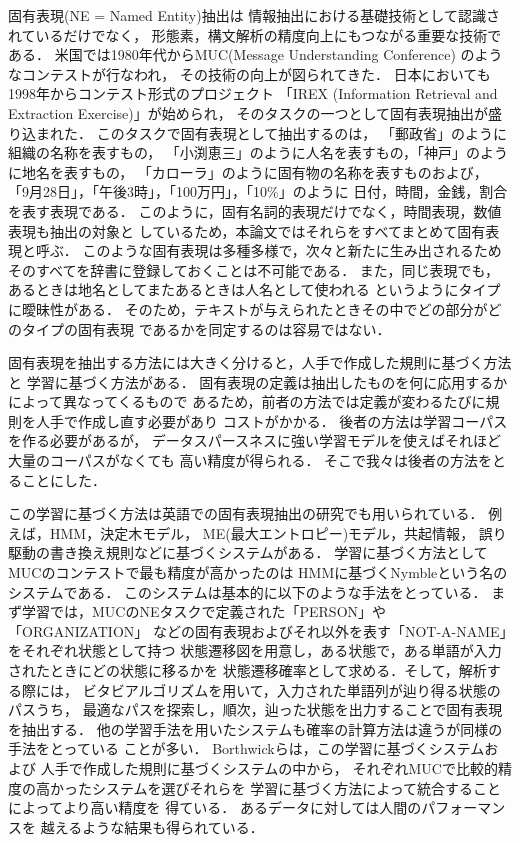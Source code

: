 固有表現(NE = Named Entity)抽出は
情報抽出における基礎技術として認識されているだけでなく，
形態素，構文解析の精度向上にもつながる重要な技術である．
米国では1980年代からMUC(Message Understanding Conference)\cite{Muc:homepage}
のようなコンテストが行なわれ，
その技術の向上が図られてきた．
日本においても1998年からコンテスト形式のプロジェクト
「IREX (Information Retrieval and Extraction Exercise)」が始められ，
そのタスクの一つとして固有表現抽出が盛り込まれた．
このタスクで固有表現として抽出するのは，
「郵政省」のように組織の名称を表すもの，
「小渕恵三」のように人名を表すもの，「神戸」のように地名を表すもの，
「カローラ」のように固有物の名称を表すものおよび，
「9月28日」，「午後3時」，「100万円」，「10\%」のように
日付，時間，金銭，割合を表す表現である．
このように，固有名詞的表現だけでなく，時間表現，数値表現も抽出の対象と
しているため，本論文ではそれらをすべてまとめて固有表現と呼ぶ．
このような固有表現は多種多様で，次々と新たに生み出されるため
そのすべてを辞書に登録しておくことは不可能である．
また，同じ表現でも，あるときは地名としてまたあるときは人名として使われる
というようにタイプに曖昧性がある．
そのため，テキストが与えられたときその中でどの部分がどのタイプの固有表現
であるかを同定するのは容易ではない．

固有表現を抽出する方法には大きく分けると，人手で作成した規則に基づく方法と
学習に基づく方法がある．
固有表現の定義は抽出したものを何に応用するかによって異なってくるもので
あるため，前者の方法では定義が変わるたびに規則を人手で作成し直す必要があり
コストがかかる．
後者の方法は学習コーパスを作る必要があるが，
データスパースネスに強い学習モデルを使えばそれほど大量のコーパスがなくても
高い精度が得られる．
そこで我々は後者の方法をとることにした．

この学習に基づく方法は英語での固有表現抽出の研究でも用いられている．
例えば，HMM\cite{Bikel:97,Miller:98}，決定木モデル\cite{Cowie:95}，
ME(最大エントロピー)モデル\cite{Borthwick:98}，共起情報\cite{Lin:98}，
誤り駆動の書き換え規則\cite{Aberdeen:95}などに基づくシステムがある．
学習に基づく方法としてMUCのコンテストで最も精度が高かったのは
HMMに基づくNymbleという名のシステムである．
このシステムは基本的に以下のような手法をとっている．
まず学習では，MUCのNEタスクで定義された「PERSON」や「ORGANIZATION」
などの固有表現およびそれ以外を表す「NOT-A-NAME」をそれぞれ状態として持つ
状態遷移図を用意し，ある状態で，ある単語が入力されたときにどの状態に移るかを
状態遷移確率として求める．そして，解析する際には，
ビタビアルゴリズムを用いて，入力された単語列が辿り得る状態のパスうち，
最適なパスを探索し，順次，辿った状態を出力することで固有表現を抽出する．
他の学習手法を用いたシステムも確率の計算方法は違うが同様の手法をとっている
ことが多い．
Borthwickらは，この学習に基づくシステムおよび
人手で作成した規則に基づくシステムの中から，
それぞれMUCで比較的精度の高かったシステムを選びそれらを
学習に基づく方法によって統合することによってより高い精度を
得ている\cite{Borthwick:98}．
あるデータに対しては人間のパフォーマンスを
越えるような結果も得られている\cite{Borthwick_muc:98}．

